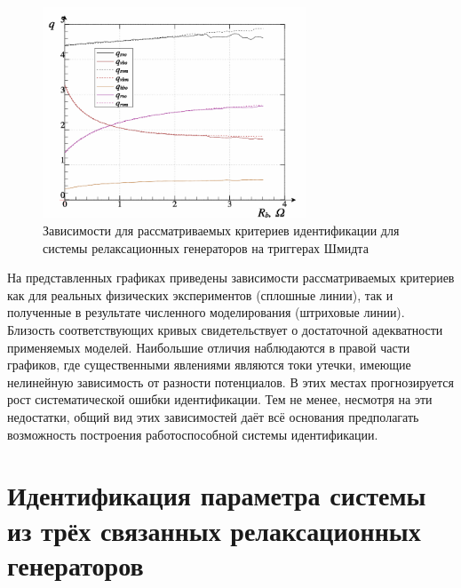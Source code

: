 \begin{figure}[htb!]
  \centerline{\includegraphics[width=0.7\textwidth]{p/relax3ds_read_q-p_q1.png} }
  \caption{Зависимости для рассматриваемых критериев идентификации для системы релаксационных генераторов на триггерах Шмидта}
  \label{atu:f:relax3ds_q}
\end{figure}

На представленных графиках приведены зависимости рассматриваемых критериев
как для реальных физических экспериментов (сплошные линии),
так и полученные в результате численного моделирования (штриховые линии).
Близость соответствующих кривых свидетельствует
о достаточной адекватности применяемых моделей.
Наибольшие отличия наблюдаются в правой части графиков, где существенными
явлениями являются токи утечки, имеющие нелинейную зависимость от разности потенциалов.
В этих местах прогнозируется рост систематической ошибки идентификации.
Тем не менее, несмотря на эти недостатки, общий вид этих зависимостей
даёт всё основания предполагать возможность построения работоспособной системы идентификации.

\section{Идентификация параметра системы из трёх связанных релаксационных генераторов}


